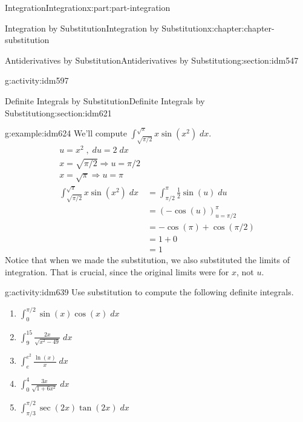\documentclass[oneside,10pt,]{book}
\numberwithin{equation}{section}
\newcommand{\amp}{&}
\begin{document}
\begin{partptx}{Integration}{}{Integration}{}{}{x:part:part-integration}
\begin{chapterptx}{Integration by Substitution}{}{Integration by Substitution}{}{}{x:chapter:chapter-substitution}
\begin{sectionptx}{Antiderivatives by Substitution}{}{Antiderivatives by Substitution}{}{}{g:section:idm547}
\begin{activity}{}{g:activity:idm597}
\end{activity}
\end{sectionptx}
%
%
\typeout{************************************************}
\typeout{************************************************}
%
\begin{sectionptx}{Definite Integrals by Substitution}{}{Definite Integrals by Substitution}{}{}{g:section:idm621}
%
\begin{example}{}{g:example:idm624}%
We'll compute \(\displaystyle \int_{\sqrt{\pi/2}}^{\sqrt{\pi}} x\sin(x^2)\;dx\).%
%
\begin{align*}
u = x^2 \;,\; du = 2\;dx\\
x = \sqrt{\pi/2} \Rightarrow u = \pi/2\\
x = \sqrt{\pi}  \Rightarrow u = \pi\\
\int_{\sqrt{\pi/2}}^{\sqrt{\pi}} x\sin(x^2)\;dx \amp = \int_{\pi/2}^\pi \frac{1}{2}\sin(u)\;du\\
\amp = \left(-\cos(u)\right)_{u=\pi/2}^{\pi}\\
\amp = -\cos(\pi) + \cos(\pi/2)\\
\amp = 1 + 0\\
\amp = 1
\end{align*}
Notice that when we made the substitution, we also substituted the limits of integration. That is crucial, since the original limits were for \(x\), not \(u\).%
\end{example}
\begin{activity}{}{g:activity:idm639}%
Use substitution to compute the following definite integrals.\begin{enumerate}[font=\bfseries,label=(\alph*),ref=\alph*]
\item{}\(\displaystyle \int_{0}^{\pi/2} \sin(x)\cos(x) \; dx\)\item{}\(\displaystyle \int_{9}^{15} \frac{2x}{\sqrt{x^2-49}} \; dx\)\item{}\(\displaystyle \int_{e}^{e^2} \frac{\ln(x)}{x}\; dx\)\item{}\(\displaystyle \int_{0}^{4} \frac{3x}{\sqrt{1+6x^2}} \; dx\)\item{}\(\displaystyle \int_{\pi/3}^{\pi/2} \sec(2x) \tan(2x) \; dx\)\end{enumerate}
\end{activity}
\end{sectionptx}
\end{chapterptx}
%
\typeout{************************************************}

\end{partptx}
\end{document}
